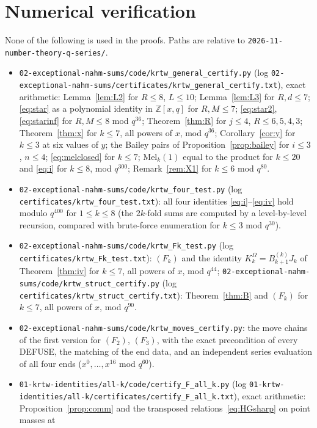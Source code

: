 \documentclass[11pt]{amsart}
\theoremstyle{definition}
\numberwithin{equation}{section}
\newcommand{\Z}{\mathbb{Z}}
\newcommand{\Mel}{\mathrm{Mel}}
\newcommand{\repo}{\nolinkurl{2026-11-number-theory-q-series/}}
\newcommand{\fpath}[1]{\nolinkurl{#1}}
\begin{document}
\section{Numerical verification}\label{sec:num}
None of the following is used in the proofs. Paths are relative to \repo.
\begin{itemize}[leftmargin=1.5em]
\item \fpath{02-exceptional-nahm-sums/code/krtw_general_certify.py} (log
\fpath{02-exceptional-nahm-sums/certificates/krtw_general_certify.txt}), exact arithmetic: Lemma~\ref{lem:L2} for
$R\le8$, $L\le10$; Lemma~\ref{lem:L3} for $R,d\le7$; \eqref{eq:star} as a polynomial identity in
$\Z[x,q]$ for $R,M\le7$; \eqref{eq:star2}, \eqref{eq:starinf} for $R,M\le8$ mod $q^{36}$;
Theorem~\ref{thm:R} for $j\le4$, $R\le6,5,4,3$; Theorem~\ref{thm:x} for $k\le7$, all powers of $x$, mod
$q^{36}$; Corollary~\ref{cor:y} for $k\le3$ at six values of $y$; the Bailey pairs of
Proposition~\ref{prop:bailey} for $i\le3$, $n\le4$; \eqref{eq:melclosed} for $k\le7$; $\Mel_k(1)$ equal to the product for $k\le20$ and \eqref{eq:i} for $k\le8$, mod $q^{300}$;
Remark~\ref{rem:X1} for $k\le6$ mod $q^{80}$.
\item \fpath{02-exceptional-nahm-sums/code/krtw_four_test.py} (log \fpath{certificates/krtw_four_test.txt}):
all four identities \eqref{eq:i}--\eqref{eq:iv} hold modulo $q^{400}$ for $1\le k\le8$ (the $2k$-fold sums
are computed by a level-by-level recursion, compared with brute-force enumeration for $k\le3$ mod $q^{30}$).
\item \fpath{02-exceptional-nahm-sums/code/krtw_Fk_test.py} (log \fpath{certificates/krtw_Fk_test.txt}):
$(F_k)$ and the identity $K^\Omega_k=B^{(k)}_{k+1}J_k$ of Theorem~\ref{thm:iv} for $k\le7$, all powers of $x$, mod $q^{44}$;
\fpath{02-exceptional-nahm-sums/code/krtw_struct_certify.py} (log
\fpath{certificates/krtw_struct_certify.txt}): Theorem~\ref{thm:B} and $(F_k)$ for $k\le7$, all powers of
$x$, mod $q^{90}$.
\item \fpath{02-exceptional-nahm-sums/code/krtw_moves_certify.py}: the move chains of the first version
for $(F_2)$, $(F_3)$, with the exact precondition of every DEFUSE, the matching of the end data, and an
independent series evaluation of all four ends ($x^0,\dots,x^{16}$ mod $q^{60}$).
\item \fpath{01-krtw-identities/all-k/code/certify_F_all_k.py} (log \fpath{01-krtw-identities/all-k/certificates/certify_F_all_k.txt}),
exact arithmetic: Proposition~\ref{prop:comm} and the transposed relations~\eqref{eq:HGsharp} on point masses at

\end{itemize}
\end{document}
